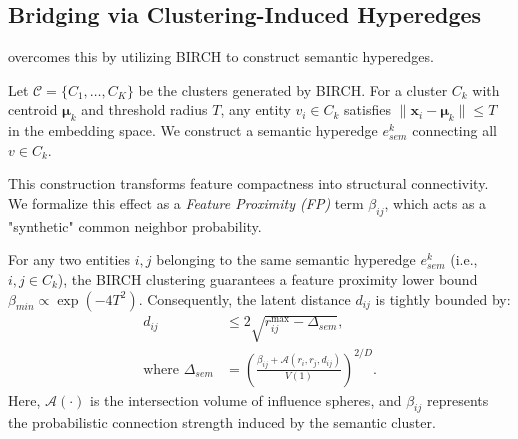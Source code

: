 \subsection{Bridging via Clustering-Induced Hyperedges}
\EHGRAG overcomes this by utilizing BIRCH to construct semantic hyperedges.
\begin{definition}
    Let $\mathcal{C} = \{C_1, \dots, C_K\}$ be the clusters generated by BIRCH. For a cluster $C_k$ with centroid $\mathbf{\mu}_k$ and threshold radius $T$, any entity $v_i \in C_k$ satisfies $\|\mathbf{x}_i - \mathbf{\mu}_k\| \le T$ in the embedding space. We construct a semantic hyperedge $e_{sem}^k$ connecting all $v \in C_k$.
\end{definition}

This construction transforms feature compactness into structural connectivity. We formalize this effect as a \textit{Feature Proximity (FP)} term $\beta_{ij}$, which acts as a "synthetic" common neighbor probability.

\begin{theorem}
    For any two entities $i, j$ belonging to the same semantic hyperedge $e_{sem}^k$ (i.e., $i, j \in C_k$), the BIRCH clustering guarantees a feature proximity lower bound $\beta_{min} \propto \exp(-4T^2)$.
    Consequently, the latent distance $d_{ij}$ is tightly bounded by:
    \begin{equation}
    \begin{split}
        d_{ij} &\le 2\sqrt{r_{ij}^{\max} - \Delta_{sem}}, \\
        \text{where } \Delta_{sem} &= \left(\frac{\beta_{ij} + \mathcal{A}(r_i, r_j, d_{ij})}{V(1)}\right)^{2/D}.
    \end{split}
    \label{eq:cluster_bound}
    \end{equation}
    Here, $\mathcal{A}(\cdot)$ is the intersection volume of influence spheres, and $\beta_{ij}$ represents the probabilistic connection strength induced by the semantic cluster.
\end{theorem}

